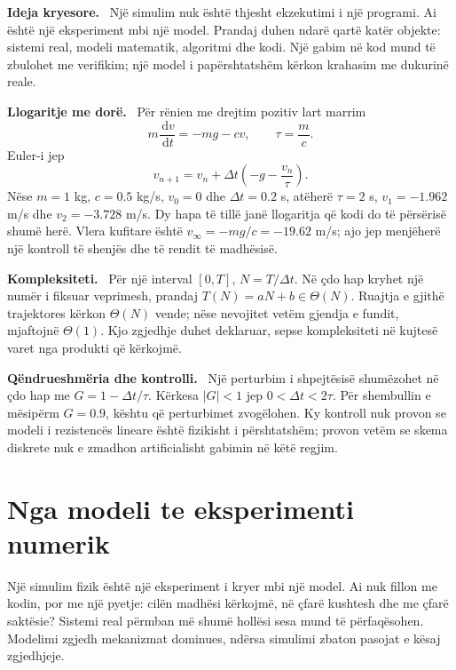 \documentclass[11pt,oneside,openany]{book}
\newcommand{\dd}{\,\mathrm{d}}
\newenvironment{ideja}{\par\medskip\noindent\textbf{Ideja kryesore.}\ }{\par\medskip}
\newenvironment{llogaritjedore}{\par\medskip\noindent\textbf{Llogaritje me dorë.}\ }{\par\medskip}
\newenvironment{kompleksitet}{\par\medskip\noindent\textbf{Kompleksiteti.}\ }{\par\medskip}
\newenvironment{qendrueshmeri}{\par\medskip\noindent\textbf{Qëndrueshmëria dhe kontrolli.}\ }{\par\medskip}
\begin{document}
\begin{ideja}
Një simulim nuk është thjesht ekzekutimi i një programi. Ai është një
eksperiment mbi një model. Prandaj duhen ndarë qartë katër objekte: sistemi
real, modeli matematik, algoritmi dhe kodi. Një gabim në kod mund të zbulohet
me verifikim; një model i papërshtatshëm kërkon krahasim me dukurinë reale.
\end{ideja}

\begin{llogaritjedore}
Për rënien me drejtim pozitiv lart marrim
\begin{equation}
 m\frac{\dd v}{\dd t}=-mg-cv,\qquad \tau=\frac{m}{c}.
\end{equation}
Euler-i jep
\begin{equation}
 v_{n+1}=v_n+\Delta t\left(-g-\frac{v_n}{\tau}\right).
\end{equation}
Nëse $m=1$ kg, $c=0.5$ kg/s, $v_0=0$ dhe $\Delta t=0.2$ s, atëherë
$\tau=2$ s, $v_1=-1.962$ m/s dhe $v_2=-3.728$ m/s. Dy hapa të tillë janë
llogaritja që kodi do të përsërisë shumë herë. Vlera kufitare është
$v_\infty=-mg/c=-19.62$ m/s; ajo jep menjëherë një kontroll të shenjës dhe
të rendit të madhësisë.
\end{llogaritjedore}

\begin{kompleksitet}
Për një interval $[0,T]$, $N=T/\Delta t$. Në çdo hap kryhet një numër i
fiksuar veprimesh, prandaj $T(N)=aN+b\in\Theta(N)$. Ruajtja e gjithë
trajektores kërkon $\Theta(N)$ vende; nëse nevojitet vetëm gjendja e fundit,
mjaftojnë $\Theta(1)$. Kjo zgjedhje duhet deklaruar, sepse kompleksiteti në
kujtesë varet nga produkti që kërkojmë.
\end{kompleksitet}

\begin{qendrueshmeri}
Një perturbim i shpejtësisë shumëzohet në çdo hap me
$G=1-\Delta t/\tau$. Kërkesa $|G|<1$ jep
$0<\Delta t<2\tau$. Për shembullin e mësipërm $G=0.9$, kështu që
perturbimet zvogëlohen. Ky kontroll nuk provon se modeli i rezistencës lineare
është fizikisht i përshtatshëm; provon vetëm se skema diskrete nuk e zmadhon
artificialisht gabimin në këtë regjim.
\end{qendrueshmeri}



\section{Nga modeli te eksperimenti numerik}
Një simulim fizik është një eksperiment i kryer mbi një model. Ai nuk fillon me kodin, por me një pyetje: cilën madhësi kërkojmë, në çfarë kushtesh dhe me çfarë saktësie? Sistemi real përmban më shumë hollësi sesa mund të përfaqësohen. Modelimi zgjedh mekanizmat dominues, ndërsa simulimi zbaton pasojat e kësaj zgjedhjeje.
\end{document}

